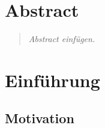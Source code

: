 \newcommand{\name}{Dennis Pidun}
\newcommand{\matr}{??????}
\newcommand{\email}{pidund@uni-hildesheim.de}
\newcommand{\studgang}{Angewandte Informatik (B.Sc.)}
\newcommand{\thema}{Safety Engineering in AGI}
\newcommand{\keywords}{}
\newcommand{\betreuer}{Dr. Pascal Reuß}

\newcommand{\semester}{Wintersemester 2019/2020}
\newcommand{\vtyp}{Seminar}
\newcommand{\veranstaltung}{IIS Seminar}
\newcommand{\prof}{Prof. Dr. Klaus-Dieter Althoff}
\newcommand{\lehrstuhl}{Institut für Informatik\\Bereich Intelligente Informationssysteme}



\usepackage[utf8]{inputenc}
\usepackage[T1]{fontenc}





\section*{Abstract}
\begin{abstract}\textsl{
Abstract einfügen.
}\end{abstract}
\newpage

\tableofcontents


\section{Einführung}
    \subsection{Motivation}

